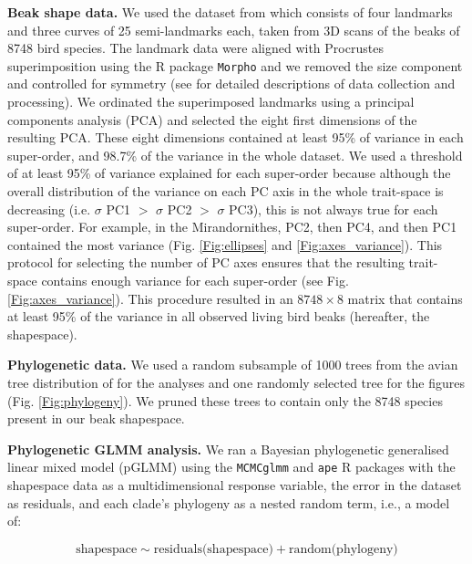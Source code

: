 \documentclass[12pt,letterpaper]{article}
\begin{document}
\textbf{Beak shape data.} We used the dataset from \cite{cooney2017mega,hughes2022global,chira2020signature} which consists of four landmarks and three curves of 25 semi-landmarks each, taken from 3D scans of the beaks of 8748 bird species.
The landmark data were aligned with Procrustes superimposition using the R package \texttt{Morpho} \cite{Rcore,Morpho} and we removed the size component and controlled for symmetry (see \cite{cooney2017mega,hughes2022global,chira2020signature} for detailed descriptions of data collection and processing).
We ordinated the superimposed landmarks using a principal components analysis (PCA) and selected the eight first dimensions of the resulting PCA.
These eight dimensions contained at least 95\% of variance in each super-order, and 98.7\% of the variance in the whole dataset.
We used a threshold of at least 95\% of variance explained for each super-order because although the overall distribution of the variance on each PC axis in the whole trait-space is decreasing (i.e. $\sigma$ PC1 $>$ $\sigma$ PC2 $>$ $\sigma$ PC3), this is not always true for each super-order.
For example, in the Mirandornithes, PC2, then PC4, and then PC1 contained the most variance (Fig.
\ref{Fig:ellipses} and \ref{Fig:axes_variance}).
This protocol for selecting the number of PC axes ensures that the resulting trait-space contains enough variance for each super-order (see Fig. \ref{Fig:axes_variance}).
This procedure resulted in an $8748 \times 8$ matrix that contains at least 95\% of the variance in all observed living bird beaks (hereafter, the shapespace). %

\textbf{Phylogenetic data.} We used a random subsample of 1000 trees from the avian tree distribution of \cite{jetz2012global} for the analyses and one randomly selected tree for the figures (Fig. \ref{Fig:phylogeny}).
We pruned these trees to contain only the 8748 species present in our beak shapespace.

\textbf{Phylogenetic GLMM analysis.} We ran a Bayesian phylogenetic generalised linear mixed model (pGLMM) using the \texttt{MCMCglmm} and \texttt{ape} R packages \cite{MCMCglmm, ape} with the shapespace data as a multidimensional response variable, the error in the dataset as residuals, and each clade's phylogeny as a nested random term, i.e., a model of:

\begin{equation}
\text{shapespace} \mathtt{\sim} \text{residuals(shapespace)} + \text{random(phylogeny)}
\end{equation}
\end{document}
